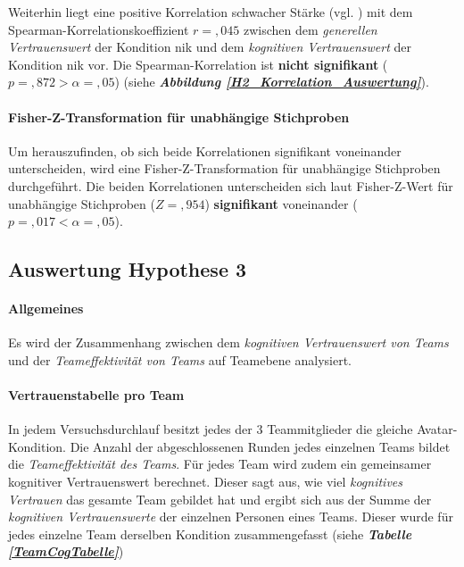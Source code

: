 \documentclass[a4paper,11pt]{article}%
\renewcommand{\\}{\vspace*{0.5\baselineskip} \newline}
\begin{document}
{Weiterhin liegt eine positive Korrelation schwacher Stärke (vgl. \citep{cohen2013statistical}) mit dem Spearman-Korrelationskoeffizient $r = ,045$ zwischen dem \textit{generellen Vertrauenswert} der Kondition \newline \ac{nik} und dem \textit{kognitiven Vertrauenswert} der Kondition \ac{nik} vor. Die Spearman-Korrelation ist \textbf{nicht signifikant} ($p = ,872 > \alpha = ,05$) (siehe \textbf{\textit{Abbildung \ref{H2_Korrelation_Auswertung}}}).

\paragraph{Fisher-Z-Transformation für unabhängige Stichproben}
Um herauszufinden, ob sich beide Korrelationen signifikant voneinander unterscheiden, wird eine Fisher-Z-Transformation für unabhängige Stichproben durchgeführt.
Die beiden Korrelationen unterscheiden sich laut Fisher-Z-Wert für unabhängige Stichproben ($Z =,954$) \textbf{signifikant} voneinander ($p =,017 < \alpha =,05$).

\newpage
\clearpage
\subsection{Auswertung Hypothese 3}
\label{Auswertung Hypothese 3}
\paragraph{Allgemeines}
Es wird der Zusammenhang zwischen dem \textit{kognitiven Vertrauenswert von Teams} und der \textit{Teameffektivität von Teams} auf Teamebene analysiert.

\paragraph{Vertrauenstabelle pro Team}
In jedem Versuchsdurchlauf besitzt jedes der 3 Teammitglieder die gleiche Avatar-Kondition. Die Anzahl der abgeschlossenen Runden jedes einzelnen Teams bildet die \textit{Teameffektivität des Teams}. 
Für jedes Team wird zudem ein gemeinsamer kognitiver Vertrauenswert berechnet. Dieser sagt aus, wie viel \textit{kognitives Vertrauen} das gesamte Team gebildet hat und ergibt sich aus der Summe der \textit{kognitiven Vertrauenswerte} der einzelnen Personen eines Teams. Dieser wurde für jedes einzelne Team derselben Kondition zusammengefasst (siehe \textbf{\textit{Tabelle \ref{TeamCogTabelle}}})

}
\end{document}
